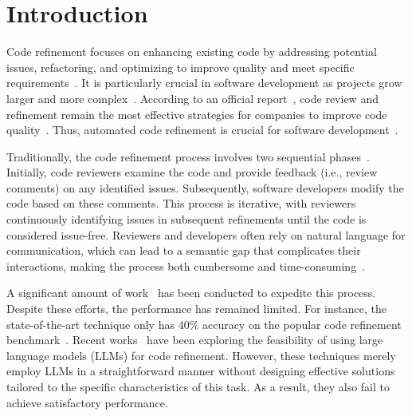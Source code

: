 \section{Introduction}

Code refinement focuses on enhancing existing code by addressing potential issues, refactoring, and optimizing to improve quality and meet specific requirements~\cite{bacchelli2013expectations,rigby2013convergent}. It is particularly crucial in software development as projects grow larger and more complex~\cite{fagan2002history,mcintosh2014impact}. 
According to an official report~\cite{Autio2022}, code review and refinement remain the most effective strategies for companies to improve code quality~\cite{sadowski2018modern,czerwonka2015code}. Thus, automated code refinement is crucial for software development~\cite{bavota2015four}. 


Traditionally, the code refinement process involves two sequential phases~\cite{bosu2013impact,rigby2014peer,bosu2015characteristics}. Initially, code reviewers examine the code and provide feedback (i.e., review comments) on any identified issues. Subsequently, software developers modify the code based on these comments. This process is iterative, with reviewers continuously identifying issues in subsequent refinements until the code is considered issue-free. Reviewers and developers often rely on natural language for communication, which can lead to a semantic gap that complicates their interactions, making the process both cumbersome and time-consuming~\cite{yang2016mining}.

A significant amount of work~\cite{tufano2019learning, tufano2021towards, tufano2022using, li2022automating} has been conducted to expedite this process. Despite these efforts, the performance has remained limited. For instance, the state-of-the-art technique only has 40\% accuracy on the popular code refinement benchmark~\cite{li2022automating}. Recent works~\cite{guo2024exploring, pornprasit2024fine,pornprasit2024gpt,yang2023enhancing,almeida2024aicodereview,fan2024exploring,watanabe2024use} have been exploring the feasibility of using large language models (LLMs) for code refinement. However, these techniques merely employ LLMs in a straightforward manner without designing effective solutions tailored to the specific characteristics of this task. As a result, they also fail to achieve satisfactory performance.

